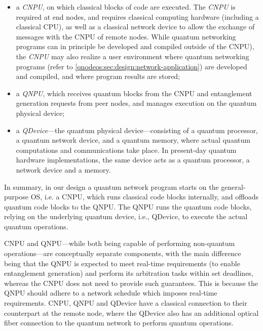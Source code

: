 \begin{itemize}
\item a \emph{\ac{CNPU}}, on which classical blocks of code are executed. The \emph{CNPU} is required at end nodes, and requires classical computing hardware (including a classical \ac{CPU}), as well as a classical network device to allow the exchange of messages with the \ac{CNPU} of remote nodes. While quantum networking programs can in principle be developed and compiled outside of the \ac{CNPU}), the \emph{CNPU} may also realize a user environment where quantum networking programs (refer to \cref{qnodeos:sec:design:network-application}) are developed and compiled, and where program results are stored; 
\item a \emph{\ac{QNPU}}, which receives quantum blocks from the \ac{CNPU} and entanglement generation requests from peer nodes, and manages execution on the quantum physical device; 
\item a \emph{\ac{QDevice}}---the quantum physical device---consisting of a quantum processor, a quantum network device, and a quantum memory, where actual quantum computations and communications take place. In present-day quantum hardware implementations, the same device acts as a quantum processor, a network device and a memory.
\end{itemize}

In summary, in our design a quantum network program starts on the general-purpose \ac{OS}, i.e. a \ac{CNPU}, which runs classical code blocks internally, and offloads quantum code blocks to the \ac{QNPU}. The \ac{QNPU} runs the quantum code blocks, relying on the underlying quantum device, i.e., \ac{QDevice}, to execute the actual quantum operations. 

\ac{CNPU} and \ac{QNPU}---while both being capable of performing non-quantum operations---are conceptually separate components, with the main difference being that the \ac{QNPU} is expected to meet real-time requirements (to enable entanglement generation) and perform its arbitration tasks within set deadlines, whereas the \ac{CNPU} does not need to provide such guarantees. This is because the QNPU should adhere to a network schedule which imposes real-time requirements. \ac{CNPU}, \ac{QNPU} and \ac{QDevice} have a classical connection to their counterpart at the remote node, where the \ac{QDevice} also has an additional optical fiber connection to the quantum network to perform quantum operations.

